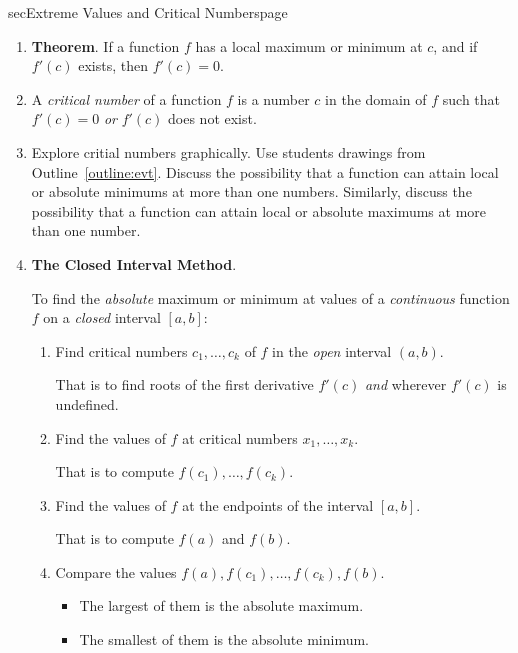 \documentclass[../main]{subfiles}
\begin{document}
\begin{outline}{sec}{Extreme Values and Critical Numbers}{page}
\begin{enumerate}
   \item \textbf{Theorem}. 
     If a function \(f\) has a local maximum or minimum at \(c\), and if \(f'(c)\) exists, then \(f'(c) = 0\).
   \item A \emph{critical number} of a function \(f\) is a number \(c\) in the domain of \(f\) such that \(f'(c) = 0\) \emph{or} \(f'(c)\) does not exist.
   \item Explore critial numbers graphically. Use students drawings from Outline~\ref{outline:evt}. Discuss the possibility that a function can attain local or absolute minimums at more than one numbers. Similarly, discuss the possibility that a function can attain local or absolute maximums at more than one number.
   \item \textbf{The Closed Interval Method}. 

     \begin{mdframed}[style=simpleCIM]
       To find the \emph{absolute} maximum or minimum at values of a \textit{continuous} function \(f\) on a \textit{closed} interval \([a,b]\):

       \begin{enumerate}[label=Step \arabic*., start=0]
         \item Find critical numbers \(c_{1}, \dots, c_{k}\) of \(f\) in the \emph{open} interval \((a,b)\).  

           That is to find roots of the first derivative \(f'(c)\) \emph{and} wherever \(f'(c)\) is undefined.

         \item Find the values of \(f\) at critical numbers \(x_{1}, \dots, x_{k}\). 

           That is to compute \(f(c_{1}), \dots, f(c_{k})\).

         \item Find the values of \(f\) at the endpoints of the interval \([a,b]\).

           That is to compute \(f(a)\) and \(f(b)\).

         \item Compare the values \(f(a), f(c_{1}), \dots, f(c_{k}), f(b)\).
           \begin{itemize}
             \item The largest of them is the absolute maximum.
             \item The smallest of them is the absolute minimum.
           \end{itemize}
       \end{enumerate}
     \end{mdframed}
         

\end{enumerate}
\end{outline}
\end{document}
